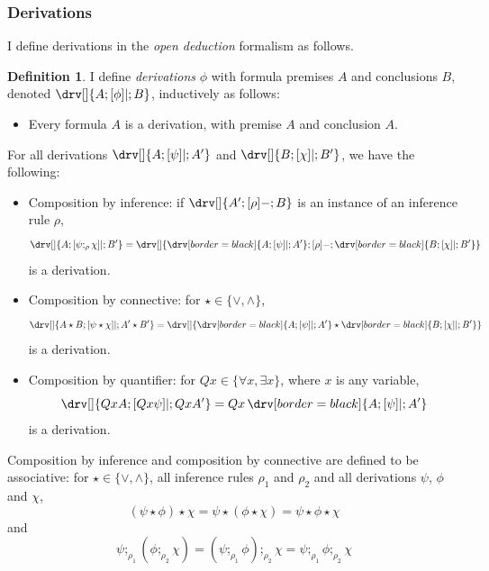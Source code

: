 \documentclass[10pt]{article}
\theoremstyle{definition}\newtheorem{remark}[theorem]{Remark}
\theoremstyle{definition}\newtheorem{example}[theorem]{Example}
\theoremstyle{definition}\newtheorem{definition}[theorem]{Definition}
\newcommand{\compByInf}[1]{;_{#1}}
\begin{document}
	\subsubsection*{Derivations}
	
	I define derivations in the \textit{open deduction} formalism \cite{GuglielmiGundersenParigotOpenDeduction} as follows.
	
	\begin{definition}
		I define \textit{derivations} $\phi$ with formula premises $A$ and conclusions $B$, denoted $\drv[] {A ; [\phi]| ; B}$, inductively as follows:
		
		\begin{itemize}
			\item Every formula $A$ is a derivation, with premise $A$ and conclusion $A$.
		\end{itemize}
		
		For all derivations $\drv[] {A ; [\psi]| ; A' }$ and $\drv[] {B ; [\chi]| ; B'}$, we have the following:
		
		\begin{itemize}
			\item Composition by inference: if $\drv[] {A' ; [\rho]- ; B}$ is an instance of an inference rule $\rho$,
			\[
			\drv[] {
				A ; [\psi \compByInf{\rho} \chi]| ; B'
			} = \drv[] {
				\drv[border=black] {
					A ; [\psi]| ; A' 
				} ; [\rho]- ; \drv[border=black] {
					B ; [\chi]| ; B'
				}
			}
			\]
			is a derivation.
			
			\item Composition by connective: for $\star \in \{\lor, \land\}$,
			\[
			\drv[] {
				A \star B ; [\psi \star \chi]| ; A' \star B'
			} = \drv[] {
				\drv[border=black] {
					A ; [\psi]| ; A' 
				} \star \drv[border=black] {
					B ; [\chi]| ; B'
				}
			}
			\]
			is a derivation.
			
			\item Composition by quantifier: for $Qx \in \{\forall x, \exists x\}$, where $x$ is any variable,
			\[
			\drv[] {
				Qx A ; [Qx \psi]| ; Qx A'
			} = Qx \, \drv[border=black] {
				A ; [\psi]| ; A'
			}
			\]
			is a derivation.
		\end{itemize}
		
		Composition by inference and composition by connective are defined to be associative: for $\star \in \{\lor, \land\}$, all inference rules $\rho_1$ and $\rho_2$ and all derivations $\psi$, $\phi$ and $\chi$,
		\[
			(\psi \star \phi) \star \chi = \psi \star (\phi \star \chi) = \psi \star \phi \star \chi
		\] and
		\[
			\psi \compByInf{\rho_1} (\phi \compByInf{\rho_2} \chi) = (\psi \compByInf{\rho_1} \phi) \compByInf{\rho_2} \chi = \psi \compByInf{\rho_1} \phi \compByInf{\rho_2} \chi
		\]
		

\end{definition}
\end{document}
